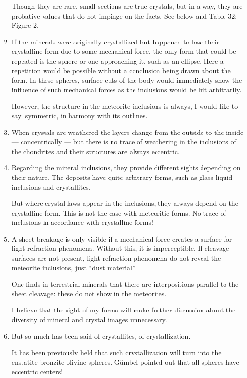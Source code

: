 \documentclass[a4paper, 12pt, oneside]{article}
\begin{document}
\begin{enumerate}
    Though they are rare, small sections are true crystals, but in a way, they are probative values that do not impinge on the facts. See below and Table 32: Figure 2.
    \item If the minerals were originally crystallized but happened to lose their crystalline form due to some mechanical force, the only form that could be repeated is the sphere or one approaching it, such as an ellipse. Here a repetition would be possible without a conclusion being drawn about the form. In these spheres, surface cuts of the body would immediately show the influence of such mechanical forces as the inclusions would be hit arbitrarily.
    
    However, the structure in the meteorite inclusions is always, I would like to say: symmetric, in harmony with its outlines.
    \item When crystals are weathered the layers change from the outside to the inside --- concentrically --- but there is no trace of weathering in the inclusions of the chondrites and their structures are always eccentric.
    \item Regarding the mineral inclusions, they provide different sights depending on their nature. The deposits have quite arbitrary forms, such as glass-liquid-inclusions and crystallites.
    
    But where crystal laws appear in the inclusions, they always depend on the crystalline form. This is not the case with meteoritic forms. No trace of inclusions in accordance with crystalline forms!
    \item A sheet breakage is only visible if a mechanical force creates a surface for light refraction phenomena. Without this, it is imperceptible. If cleavage surfaces are not present, light refraction phenomena do not reveal the meteorite inclusions, just ``dust material''.
    
    One finds in terrestrial minerals that there are interpositions parallel to the sheet cleavage: these do not show in the meteorites.
    
    I believe that the sight of my forms will make further discussion about the diversity of mineral and crystal images unnecessary.
    \item But so much has been said of crystallites, of crystallization.
    
    It has been previously held that such crystallization will turn into the enstatite-bronzite-olivine spheres. Gümbel pointed out that all spheres have eccentric centers!
    

\end{enumerate}
\end{document}
